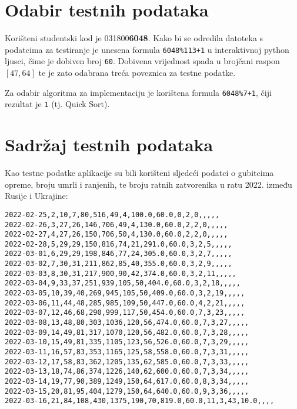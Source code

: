 \documentclass[12pt,a4paper]{report}
\begin{document}
\thispagestyle{empty}




\tableofcontents
\newpage

\setcounter{page}{1}

\chapter{Odabir testnih podataka}

Korišteni studentski kod je 031800\textbf{6048}. Kako bi se odredila
datoteka s podatcima za testiranje je unesena formula
\verb|6048%113+1| u interaktivnoj python ljusci, čime je dobiven broj
\texttt{60}. Dobivena vrijednost spada u brojčani raspon
$[47, 64]$ te je zato odabrana treća poveznica za testne
podatke.

Za odabir algoritma za implementaciju je korištena formula
\verb|6048%7+1|, čiji rezultat je \texttt{1} (tj. Quick Sort).

\chapter{Sadržaj testnih podataka}

Kao testne podatke aplikacije su bili korišteni sljedeći podatci o
gubitcima opreme, broju umrli i ranjenih, te broju ratnih zatvorenika u
ratu 2022. između Rusije i Ukrajine:

\begin{verbatim}
2022-02-25,2,10,7,80,516,49,4,100.0,60.0,0,2,0,,,,,
2022-02-26,3,27,26,146,706,49,4,130.0,60.0,2,2,0,,,,,
2022-02-27,4,27,26,150,706,50,4,130.0,60.0,2,2,0,,,,,
2022-02-28,5,29,29,150,816,74,21,291.0,60.0,3,2,5,,,,,
2022-03-01,6,29,29,198,846,77,24,305.0,60.0,3,2,7,,,,,
2022-03-02,7,30,31,211,862,85,40,355.0,60.0,3,2,9,,,,,
2022-03-03,8,30,31,217,900,90,42,374.0,60.0,3,2,11,,,,,
2022-03-04,9,33,37,251,939,105,50,404.0,60.0,3,2,18,,,,,
2022-03-05,10,39,40,269,945,105,50,409.0,60.0,3,2,19,,,,,
2022-03-06,11,44,48,285,985,109,50,447.0,60.0,4,2,21,,,,,
2022-03-07,12,46,68,290,999,117,50,454.0,60.0,7,3,23,,,,,
2022-03-08,13,48,80,303,1036,120,56,474.0,60.0,7,3,27,,,,,
2022-03-09,14,49,81,317,1070,120,56,482.0,60.0,7,3,28,,,,,
2022-03-10,15,49,81,335,1105,123,56,526.0,60.0,7,3,29,,,,,
2022-03-11,16,57,83,353,1165,125,58,558.0,60.0,7,3,31,,,,,
2022-03-12,17,58,83,362,1205,135,62,585.0,60.0,7,3,33,,,,,
2022-03-13,18,74,86,374,1226,140,62,600.0,60.0,7,3,34,,,,,
2022-03-14,19,77,90,389,1249,150,64,617.0,60.0,8,3,34,,,,,
2022-03-15,20,81,95,404,1279,150,64,640.0,60.0,9,3,36,,,,,
2022-03-16,21,84,108,430,1375,190,70,819.0,60.0,11,3,43,10.0,,,,
\end{verbatim}
\end{document}
